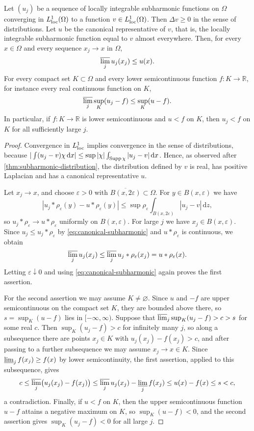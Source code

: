 \begin{theorem}\label{thm:hartogs-subharmonic}
Let $(u_j)$ be a sequence of locally integrable subharmonic functions on $\Omega$ converging in $L^1_{\mathrm{loc}}(\Omega)$ to a function $v\in L^1_{\mathrm{loc}}(\Omega)$. Then $\Delta v\geq0$ in the sense of distributions. Let $u$ be the canonical representative of $v$, that is, the locally integrable subharmonic function equal to $v$ almost everywhere. Then, for every $x\in\Omega$ and every sequence $x_j\to x$ in $\Omega$,
\[
 \varlimsup_j u_j(x_j)\leq u(x).
\]
For every compact set $K\subset\Omega$ and every lower semicontinuous function $f\colon K\to\mathbb R$, for instance every real continuous function on $K$,
\[
 \varlimsup_j\sup_K(u_j-f)\leq\sup_K(u-f).
\]
In particular, if $f\colon K\to\mathbb R$ is lower semicontinuous and $u<f$ on $K$, then $u_j<f$ on $K$ for all sufficiently large $j$.
\end{theorem}
\begin{proof}
Convergence in $L^1_{\mathrm{loc}}$ implies convergence in the sense of distributions, because $|\int(u_j-v)\chi\,\mathrm dx|\leq\sup|\chi|\int_{\operatorname{Supp}\chi}|u_j-v|\,\mathrm dx$. Hence, as observed after \cref{thm:subharmonic-distribution}, the distribution defined by $v$ is real, has positive Laplacian and has a canonical representative $u$.

Let $x_j\to x$, and choose $\varepsilon>0$ with $\overline{B(x,2\varepsilon)}\subset\Omega$. For $y\in B(x,\varepsilon)$ we have
\[
 |u_j*\rho_\varepsilon(y)-u*\rho_\varepsilon(y)|\leq\sup\rho_\varepsilon\int_{B(x,2\varepsilon)}|u_j-v|\,\mathrm d z,
\]
so $u_j*\rho_\varepsilon\to u*\rho_\varepsilon$ uniformly on $B(x,\varepsilon)$. For large $j$ we have $x_j\in B(x,\varepsilon)$. Since $u_j\leq u_j*\rho_\varepsilon$ by \eqref{eq:canonical-subharmonic} and $u*\rho_\varepsilon$ is continuous, we obtain
\[
 \varlimsup_j u_j(x_j)\leq\varlimsup_ju_j*\rho_\varepsilon(x_j)=u*\rho_\varepsilon(x).
\]
Letting $\varepsilon\downarrow0$ and using \eqref{eq:canonical-subharmonic} again proves the first assertion.

For the second assertion we may assume $K\neq\varnothing$. Since $u$ and $-f$ are upper semicontinuous on the compact set $K$, they are bounded above there, so $s=\sup_K(u-f)$ lies in $[-\infty,\infty)$. Suppose that $\varlimsup_j\sup_K(u_j-f)>c>s$ for some real $c$. Then $\sup_K(u_j-f)>c$ for infinitely many $j$, so along a subsequence there are points $x_j\in K$ with $u_j(x_j)-f(x_j)>c$, and after passing to a further subsequence we may assume $x_j\to x\in K$. Since $\varliminf_jf(x_j)\geq f(x)$ by lower semicontinuity, the first assertion, applied to this subsequence, gives
\[
 c\leq\varlimsup_j\bigl(u_j(x_j)-f(x_j)\bigr)\leq\varlimsup_ju_j(x_j)-\varliminf_jf(x_j)\leq u(x)-f(x)\leq s<c,
\]
a contradiction. Finally, if $u<f$ on $K$, then the upper semicontinuous function $u-f$ attains a negative maximum on $K$, so $\sup_K(u-f)<0$, and the second assertion gives $\sup_K(u_j-f)<0$ for all large $j$.
\end{proof}

